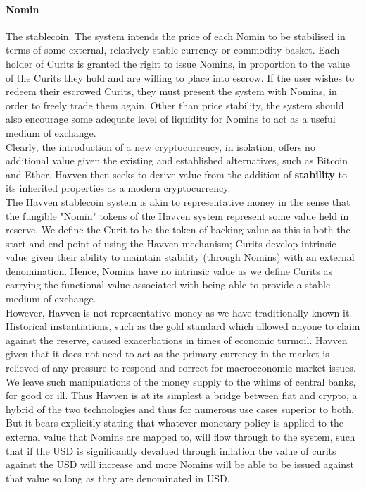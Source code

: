 \paragraph{Nomin} The stablecoin. The system intends the price of each Nomin to be stabilised in terms of some external, relatively-stable currency or commodity basket. Each holder of Curits is granted the right to issue Nomins, in proportion to the value of the Curits they hold and are willing to place into escrow. If the user wishes to redeem their escrowed Curits, they must present the system with Nomins, in order to freely trade them again. Other than price stability, the system should also encourage some adequate level of liquidity for Nomins to act as a useful medium of exchange. \\

\noindent Clearly, the introduction of a new cryptocurrency, in isolation, offers no additional value given the existing and established alternatives, such as Bitcoin and Ether. Havven then seeks to derive value from the addition of \textbf{stability} to its inherited properties as a modern cryptocurrency. \\

\noindent The Havven stablecoin system is akin to representative money in the sense that the fungible "Nomin" tokens of the Havven system represent some value held in reserve. We define the Curit to be the token of backing value as this is both the start and end point of using the Havven mechanism; Curits develop intrinsic value given their ability to maintain stability (through Nomins) with an external denomination. Hence, Nomins have no intrinsic value as we define Curits as carrying the functional value associated with being able to provide a stable medium of exchange. \\

\noindent However, Havven is not representative money as we have traditionally known it. Historical instantiations, such as the gold standard which allowed anyone to claim against the reserve, caused exacerbations in times of economic turmoil. Havven given that it does not need to act as the primary currency in the market is relieved of any pressure to respond and correct for macroeconomic market issues. We leave such manipulations of the money supply to the whims of central banks, for good or ill. Thus Havven is at its simplest a bridge between fiat and crypto, a hybrid of the two technologies and thus for numerous use cases superior to both. But it bears explicitly stating that whatever monetary policy is applied to the external value that Nomins are mapped to, will flow through to the system, such that if the USD is significantly devalued through inflation the value of curits against the USD will increase and more Nomins will be able to be issued against that value so long as they are denominated in USD. \\

